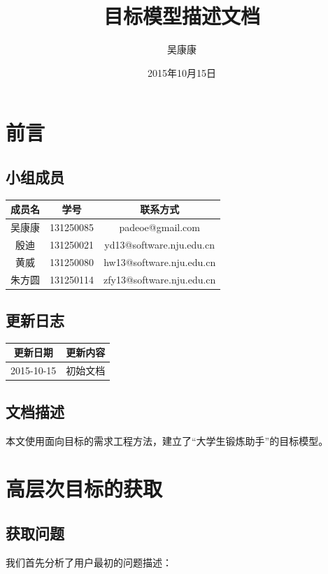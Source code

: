 \documentclass[UTF8]{ctexart}
\title{目标模型描述文档}
\author{吴康康}
\date{2015年10月15日}
\begin{document}
\maketitle
\tableofcontents

\section{前言}

\subsection{小组成员}

\begin{center}
\begin{tabular}{|c|c|c|}
\hline
成员名&学号&联系方式\\
\hline
吴康康&131250085&padeoe@gmail.com\\
\hline
殷迪&131250021&yd13@software.nju.edu.cn\\
\hline
黄威&131250080&hw13@software.nju.edu.cn\\
\hline
朱方圆&131250114&zfy13@software.nju.edu.cn\\
\hline
\end{tabular}
\end{center}

\subsection{更新日志}

\begin{center}
\begin{tabular}{|c|c|}
\hline
更新日期&更新内容\\
\hline
2015-10-15&初始文档\\
\hline
\end{tabular}
\end{center}

\subsection{文档描述}本文使用面向目标的需求工程方法，建立了“大学生锻炼助手”的目标模型。

\section{高层次目标的获取}
\subsection{获取问题}
我们首先分析了用户最初的问题描述：
\end{document}
